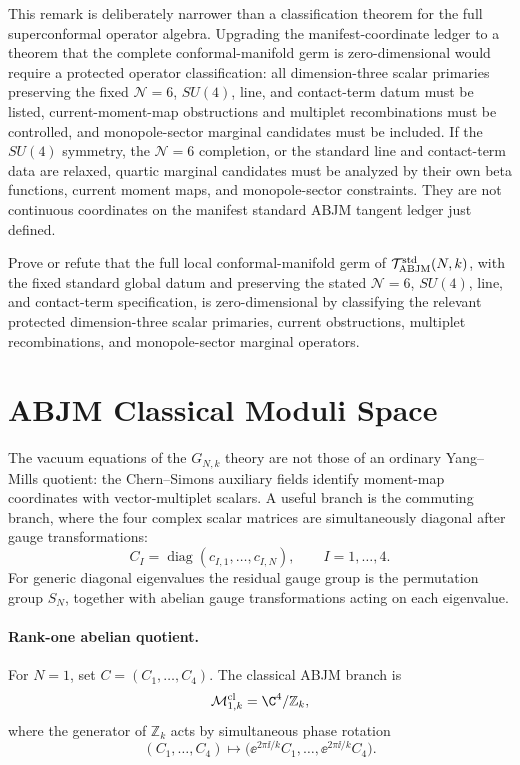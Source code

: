 This remark is deliberately narrower than a classification theorem for the
full superconformal operator algebra.  Upgrading the manifest-coordinate
ledger to a theorem that the complete conformal-manifold germ is
zero-dimensional would require a protected operator classification: all
dimension-three scalar primaries preserving the fixed \(\mathcal N=6\),
\(SU(4)\), line, and contact-term datum must be listed, current-moment-map
obstructions and multiplet recombinations must be controlled, and
monopole-sector marginal candidates must be included.  If the \(SU(4)\)
symmetry, the \(\mathcal N=6\) completion, or the standard line and
contact-term data are relaxed, quartic marginal candidates must be analyzed by
their own beta functions, current moment maps, and monopole-sector
constraints.  They are not continuous coordinates on the manifest standard
ABJM tangent ledger just defined.

\begin{openproblem}
\label{op:abjm-conformal-germ-completeness}
Prove or refute that the full local conformal-manifold germ of
\(\mathcal T_{\rm ABJM}^{\rm std}(N,k)\), with the fixed standard global datum
and preserving the stated \(\mathcal N=6\), \(SU(4)\), line, and contact-term
specification, is zero-dimensional by classifying the relevant protected
dimension-three scalar primaries, current obstructions, multiplet
recombinations, and monopole-sector marginal operators.
\end{openproblem}

\section{ABJM Classical Moduli Space}
\label{sec:abjm-classical-moduli-space}

The vacuum equations of the \(G_{N,k}\) theory are not those of an ordinary
Yang--Mills quotient: the Chern--Simons auxiliary fields identify moment-map
coordinates with vector-multiplet scalars.  A useful branch is the commuting
branch, where the four complex scalar matrices are simultaneously diagonal
after gauge transformations:
\[
  C_I=\operatorname{diag}(c_{I,1},\ldots,c_{I,N}),\qquad I=1,\ldots,4 .
\]
For generic diagonal eigenvalues the residual gauge group is the permutation
group \(S_N\), together with abelian gauge transformations acting on each
eigenvalue.

\paragraph{Rank-one abelian quotient.}
For \(N=1\), set \(C=(C_1,\ldots,C_4)\).  The classical ABJM branch is
\[
  \mathcal M_{1,k}^{\rm cl}=\C^4/\mathbb Z_k,
\]
where the generator of \(\mathbb Z_k\) acts by simultaneous phase rotation
\[
  (C_1,\ldots,C_4)\longmapsto
  \bigl(\ee^{2\pi\ii/k}C_1,\ldots,\ee^{2\pi\ii/k}C_4\bigr).
\]

